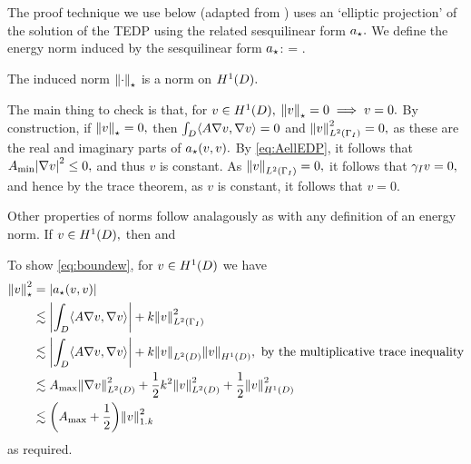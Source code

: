 The proof technique we use below (adapted from \cite{FeWu:11,ChNi:18}) uses an `elliptic projection' of the solution of the TEDP using the related sesquilinear form $a_{\star}.$ We define the energy norm induced by the sesquilinear form $a_{\star}$:
\beqs
\Npi{\vo} = \sqrt{\abs{\api(\vo,\vo)}}.
\eeqs

\label{lem:inducednorm}
The induced norm $\Npi{\cdot}$ is a norm on $\HoD.$
\ele

The main thing to check is that, for $v \in \HoD,$ $\Npi{v}=0 \implies v=0.$ By construction, if $\Npi{v}=0,$ then $\int_{D} \IP{A \grad v}{\grad v} =0$ and $\NLtGI{v}^2 = 0,$ as these are the real and imaginary parts of $a_{\star}(v,v).$ By \eqref{eq:AellEDP}, it follows that $\Amin \abs{\grad v}^2 \leq 0,$ and thus $v$ is constant. As $\NLtGI{v} = 0,$ it follows that $\gamma_{I} v =0,$ and hence by the trace theorem, as $v$ is constant, it follows that $v=0.$

Other properties of norms follow analagously as with any definition of an energy norm.
\epf
{}\label{lem:normbound}
If $v \in \HoD,$ then
\beq\label{eq:boundew}
 \lesssim \sqrt{\Amax+\half}
\eeq
and
\beq\label{eq:boundwe}
 \lesssim \max{} 
\eeq
\ele

To show \eqref{eq:boundew}, for $ v \in \HoD$ we have
\begin{align*}
  \Npi{v}^2 &= \abs{\api(v,v)}\\
            &\lesssim \abs{\int_{D} \IP{A \grad v}{\grad v}} + k\NLtGI{v}^2 \\
            &\lesssim \abs{\int_{D} \IP{A \grad v}{\grad v}} + k\NLtD{v}\NHoD{v}, \text{ by the multiplicative trace inequality}\\
            &\lesssim \Amax \NLtD{\grad v}^2 + \half k^2 \NLtD{v}^2 + \half \NHoD{v}^2\\
  &\lesssim \mleft(\Amax+\half\mright)\NW{v}^2
\end{align*}
as required.

